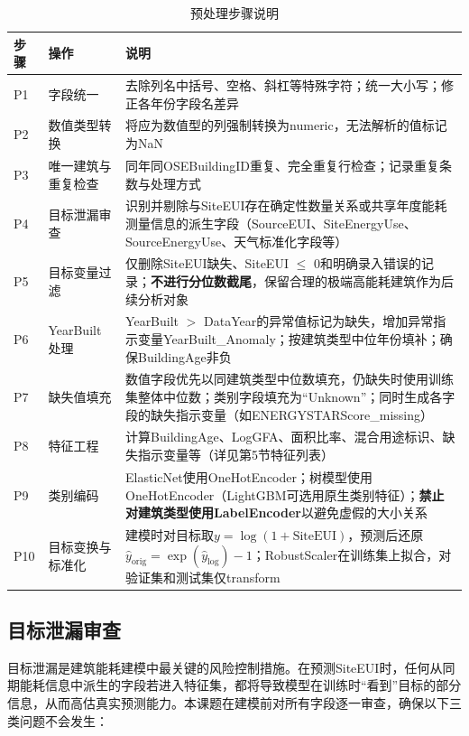 \begin{table}[H]
\centering
\caption{预处理步骤说明}
\label{tab:preprocessing}
\begin{tabular}{p{1cm}p{3.5cm}p{7.5cm}}
\hline
\textbf{步骤} & \textbf{操作} & \textbf{说明} \\
\hline
P1 & 字段统一 & 去除列名中括号、空格、斜杠等特殊字符；统一大小写；修正各年份字段名差异 \\
\hline
P2 & 数值类型转换 & 将应为数值型的列强制转换为numeric，无法解析的值标记为NaN \\
\hline
P3 & 唯一建筑与重复检查 & 同年同OSEBuildingID重复、完全重复行检查；记录重复条数与处理方式 \\
\hline
P4 & 目标泄漏审查 & 识别并剔除与SiteEUI存在确定性数量关系或共享年度能耗测量信息的派生字段（SourceEUI、SiteEnergyUse、SourceEnergyUse、天气标准化字段等） \\
\hline
P5 & 目标变量过滤 & 仅删除SiteEUI缺失、SiteEUI $\le$ 0和明确录入错误的记录；\textbf{不进行分位数截尾}，保留合理的极端高能耗建筑作为后续分析对象 \\
\hline
P6 & YearBuilt处理 & YearBuilt $>$ DataYear的异常值标记为缺失，增加异常指示变量YearBuilt\_Anomaly；按建筑类型中位年份填补；确保BuildingAge非负 \\
\hline
P7 & 缺失值填充 & 数值字段优先以同建筑类型中位数填充，仍缺失时使用训练集整体中位数；类别字段填充为``Unknown''；同时生成各字段的缺失指示变量（如ENERGYSTARScore\_missing） \\
\hline
P8 & 特征工程 & 计算BuildingAge、LogGFA、面积比率、混合用途标识、缺失指示变量等（详见第5节特征列表） \\
\hline
P9 & 类别编码 & ElasticNet使用OneHotEncoder；树模型使用OneHotEncoder（LightGBM可选用原生类别特征）；\textbf{禁止对建筑类型使用LabelEncoder}以避免虚假的大小关系 \\
\hline
P10 & 目标变换与标准化 & 建模时对目标取$y = \log(1+\text{SiteEUI})$，预测后还原$\hat{y}_{\text{orig}} = \exp(\hat{y}_{\text{log}})-1$；RobustScaler在训练集上拟合，对验证集和测试集仅transform \\
\hline
\end{tabular}
\end{table}

\subsection{目标泄漏审查}

目标泄漏是建筑能耗建模中最关键的风险控制措施。在预测SiteEUI时，任何从同期能耗信息中派生的字段若进入特征集，都将导致模型在训练时``看到''目标的部分信息，从而高估真实预测能力。本课题在建模前对所有字段逐一审查，确保以下三类问题不会发生：

